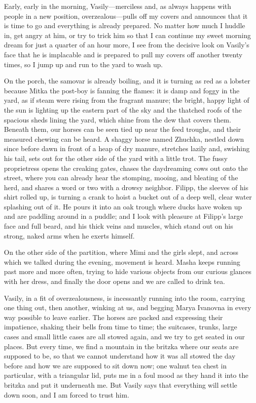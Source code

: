Early, early in the morning, Vasily---merciless and, as always happens with people in a new position, overzealous---pulls off my covers and announces that it is time to go and everything is already prepared. No matter how much I huddle in, get angry at him, or try to trick him so that I can continue my sweet morning dream for just a quarter of an hour more, I see from the decisive look on Vasily's face that he is implacable and is prepared to pull my covers off another twenty times, so I jump up and run to the yard to wash up.

On the porch, the samovar is already boiling, and it is turning as red as a lobster because Mitka the post-boy is fanning the flames: it is damp and foggy in the yard, as if steam were rising from the fragrant manure; the bright, happy light of the sun is lighting up the eastern part of the sky and the thatched roofs of the spacious sheds lining the yard, which shine from the dew that covers them. Beneath them, our horses can be seen tied up near the feed troughs, and their measured chewing can be heard. A shaggy horse named Zhuchka, nestled down since before dawn in front of a heap of dry manure, stretches lazily and, swishing his tail, sets out for the other side of the yard with a little trot. The fussy proprietress opens the creaking gates, chases the daydreaming cows out onto the street, where you can already hear the stomping, mooing, and bleating of the herd, and shares a word or two with a drowsy neighbor. Filipp, the sleeves of his shirt rolled up, is turning a crank to hoist a bucket out of a deep well, clear water splashing out of it. He pours it into an oak trough where ducks have woken up and are paddling around in a puddle; and I look with pleasure at Filipp's large face and full beard, and his thick veins and muscles, which stand out on his strong, naked arms when he exerts himself.

On the other side of the partition, where Mimi and the girls slept, and across which we talked during the evening, movement is heard. Masha keeps running past more and more often, trying to hide various objects from our curious glances with her dress, and finally the door opens and we are called to drink tea.

Vasily, in a fit of overzealousness, is incessantly running into the room, carrying one thing out, then another, winking at us, and begging Marya Ivanovna in every way possible to leave earlier. The horses are packed and expressing their impatience, shaking their bells from time to time; the suitcases, trunks, large cases and small little cases are all stowed again, and we try to get seated in our places. But every time, we find a mountain in the britzka where our seats are supposed to be, so that we cannot understand how it was all stowed the day before and how we are supposed to sit down now; one walnut tea chest in particular, with a triangular lid, puts me in a foul mood as they hand it into the britzka and put it underneath me. But Vasily says that everything will settle down soon, and I am forced to trust him.

 